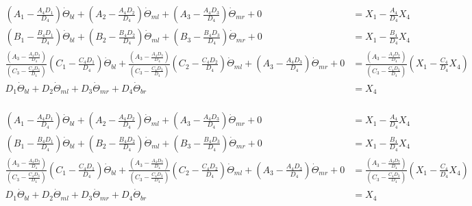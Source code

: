 \documentclass[11pt, landscape]{article}
\begin{document}
\begin{align}
  \left(A_1 - \frac{A_4D_1}{D_4}\right)\dot{\Theta}_{bl} + \left(A_2 - \frac{A_4D_2}{D_4}\right)\dot{\Theta}_{ml} + \left(A_3 - \frac{A_4D_3}{D_4}\right)\dot{\Theta}_{mr} + 0 &= X_1 - \frac{A_4}{D_4}X_4\\
  \left(B_1 - \frac{B_4D_1}{D_4}\right)\dot{\Theta}_{bl} + \left(B_2 - \frac{B_4D_2}{D_4}\right)\dot{\Theta}_{ml} + \left(B_3 - \frac{B_4D_3}{D_4}\right)\dot{\Theta}_{mr} + 0 &= X_1 - \frac{B_4}{D_4}X_4\\
  \frac{\left(A_3 - \frac{A_4D_3}{D_4}\right)}{\left(C_3 - \frac{C_4D_3}{D_4}\right)}\left(C_1 - \frac{C_4D_1}{D_4}\right)\dot{\Theta}_{bl} + 
  \frac{\left(A_3 - \frac{A_4D_3}{D_4}\right)}{\left(C_3 - \frac{C_4D_3}{D_4}\right)}\left(C_2 - \frac{C_4D_2}{D_4}\right)\dot{\Theta}_{ml} + 
  \left(A_3 - \frac{A_4D_3}{D_4}\right)\dot{\Theta}_{mr} + 0 &= \frac{\left(A_3 - \frac{A_4D_3}{D_4}\right)}{\left(C_3 - \frac{C_4D_3}{D_4}\right)}\left(X_1 - \frac{C_4}{D_4}X_4\right)\\
  D_1\dot{\Theta}_{bl} + D_2 \dot{\Theta}_{ml} + D_3 \dot{\Theta}_{mr} + D_4 \dot{\Theta}_{br} &= X_4 \\
\end{align}

\begin{align}
  \left(A_1 - \frac{A_4D_1}{D_4}\right)\dot{\Theta}_{bl} + \left(A_2 - \frac{A_4D_2}{D_4}\right)\dot{\Theta}_{ml} + \left(A_3 - \frac{A_4D_3}{D_4}\right)\dot{\Theta}_{mr} + 0 &= X_1 - \frac{A_4}{D_4}X_4\\
  \left(B_1 - \frac{B_4D_1}{D_4}\right)\dot{\Theta}_{bl} + \left(B_2 - \frac{B_4D_2}{D_4}\right)\dot{\Theta}_{ml} + \left(B_3 - \frac{B_4D_3}{D_4}\right)\dot{\Theta}_{mr} + 0 &= X_1 - \frac{B_4}{D_4}X_4\\
  \frac{\left(A_3 - \frac{A_4D_3}{D_4}\right)}{\left(C_3 - \frac{C_4D_3}{D_4}\right)}\left(C_1 - \frac{C_4D_1}{D_4}\right)\dot{\Theta}_{bl} + 
  \frac{\left(A_3 - \frac{A_4D_3}{D_4}\right)}{\left(C_3 - \frac{C_4D_3}{D_4}\right)}\left(C_2 - \frac{C_4D_2}{D_4}\right)\dot{\Theta}_{ml} + 
  \left(A_3 - \frac{A_4D_3}{D_4}\right)\dot{\Theta}_{mr} + 0 &= \frac{\left(A_3 - \frac{A_4D_3}{D_4}\right)}{\left(C_3 - \frac{C_4D_3}{D_4}\right)}\left(X_1 - \frac{C_4}{D_4}X_4\right)\\
  D_1\dot{\Theta}_{bl} + D_2 \dot{\Theta}_{ml} + D_3 \dot{\Theta}_{mr} + D_4 \dot{\Theta}_{br} &= X_4 \\
\end{align}
\end{document}
